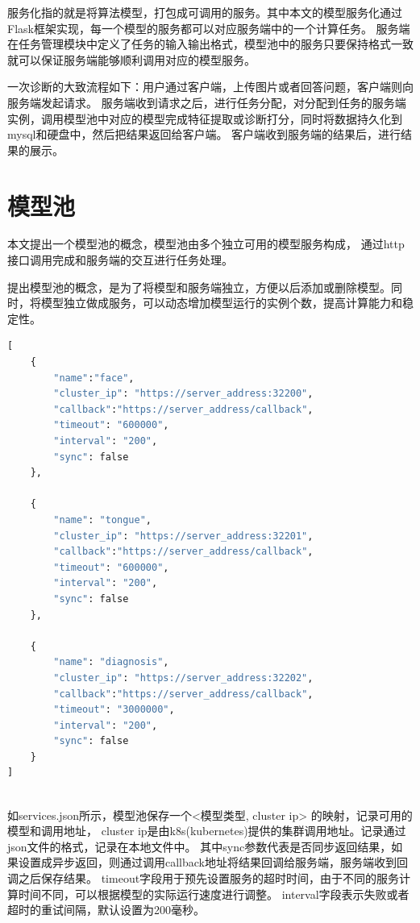 服务化指的就是将算法模型，打包成可调用的服务。其中本文的模型服务化通过Flask框架实现，每一个模型的服务都可以对应服务端中的一个计算任务。
服务端在任务管理模块中定义了任务的输入输出格式，模型池中的服务只要保持格式一致就可以保证服务端能够顺利调用对应的模型服务。

一次诊断的大致流程如下：用户通过客户端，上传图片或者回答问题，客户端则向服务端发起请求。
服务端收到请求之后，进行任务分配，对分配到任务的服务端实例，调用模型池中对应的模型完成特征提取或诊断打分，同时将数据持久化到mysql和硬盘中，然后把结果返回给客户端。
客户端收到服务端的结果后，进行结果的展示。

\section{模型池}
本文提出一个模型池的概念，模型池由多个独立可用的模型服务构成， 通过http 接口调用完成和服务端的交互进行任务处理。

提出模型池的概念，是为了将模型和服务端独立，方便以后添加或删除模型。同时，将模型独立做成服务，可以动态增加模型运行的实例个数，提高计算能力和稳定性。



\begin{lstlisting}[language={Python}, title=services.json]
[
    {
        "name":"face",
        "cluster_ip": "https://server_address:32200",
        "callback":"https://server_address/callback",
        "timeout": "600000",
        "interval": "200",
        "sync": false
    }, 
    
    {
        "name": "tongue",
        "cluster_ip": "https://server_address:32201",
        "callback":"https://server_address/callback",
        "timeout": "600000",
        "interval": "200",
        "sync": false
    },
    
    {
        "name": "diagnosis",
        "cluster_ip": "https://server_address:32202",
        "callback":"https://server_address/callback",
        "timeout": "3000000",
        "interval": "200",
        "sync": false
    }
]
    
\end{lstlisting}

如services.json所示，模型池保存一个<模型类型, cluster ip> 的映射，记录可用的模型和调用地址， cluster ip是由k8s(kubernetes)提供的集群调用地址。记录通过json文件的格式，记录在本地文件中。
其中sync参数代表是否同步返回结果，如果设置成异步返回，则通过调用callback地址将结果回调给服务端，服务端收到回调之后保存结果。
timeout字段用于预先设置服务的超时时间，由于不同的服务计算时间不同，可以根据模型的实际运行速度进行调整。
interval字段表示失败或者超时的重试间隔，默认设置为200毫秒。

